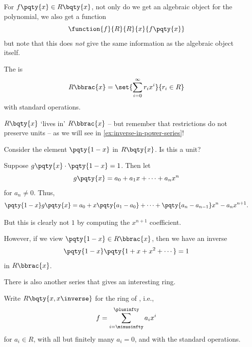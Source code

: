 \begin{remark}
    For \(f \pqty{x} \in R\bqty{x}\), not only do we get an algebraic object for the polynomial, we also get a function
    \[
        \function{f}{R}{R}{x}{f\pqty{x}}
    \]
    but note that this does \emph{not} give the same information as the algebraic object itself.
\end{remark}

\begin{definition}
    \label{def:formal-power-series}%
    The  is
    \[
        R \bbrac{x} = \set{\sum_{i = 0}^{\infty} r_i x^i}{r_i \in R}
    \]
    with standard operations.
\end{definition}

\(R\bqty{x}\) `lives in' \(R\bbrac{x}\) -- but remember that restrictions do not preserve units -- as we will see in \autoref{ex:inverse-in-power-series}!

\begin{example}
    \label{ex:inverse-in-power-series}%
    Consider the element \(\pqty{1 - x}\) in \(R\bqty{x}\). Is this a unit?

    Suppose \(g\pqty{x} \cdot \pqty{1 - x} = 1\). Then let
    \[
        g\pqty{x} = a_0 + a_1 x + \cdots + a_n x^n
    \]
    for \(a_n \neq 0\). Thus,
    \[
        \pqty{1 - x} g\pqty{x} = a_0 + x\pqty{a_1 - a_0} + \cdots + \pqty{a_n - a_{n - 1}} x^n - a_n x^{n + 1}.
    \]

    But this is clearly not \(1\) by computing the \(x^{n + 1}\) coefficient.

    However, if we view \(\pqty{1 - x} \in R\bbrac{x}\), then we have an inverse
    \[
        \pqty{1 - x} \pqty{1 + x + x^2 + \cdots} = 1
    \]
    in \(R\bbrac{x}\).
\end{example}

There is also another series that gives an interesting ring.

\begin{definition}
    \label{def:laurent-polynomials}%
    Write \(R\bqty{x, x\inverse}\) for the ring of , i.e.,
    \[
        f = \sum_{i = \minusinfty}^{\plusinfty} a_i x^i
    \]
    for \(a_i \in R\), with all but finitely many \(a_i = 0\), and with the standard operations.
\end{definition}